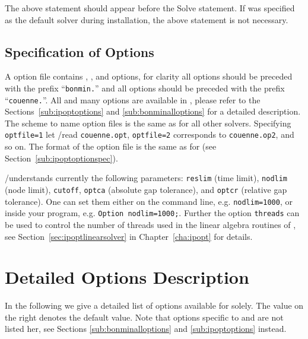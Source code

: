 The above statement should appear before the Solve statement.
If \COUENNE was specified as the default solver during \GAMS installation, the above statement is not necessary.

\subsection{Specification of Options}

A \COUENNE option file contains \IPOPT, \BONMIN, and \COUENNE options, for clarity all \BONMIN options should be preceded with the prefix ``\texttt{bonmin.}'' and all \COUENNE options should be preceded with the prefix ``\texttt{couenne.}''.
All \IPOPT and many \BONMIN options are available in \COUENNE, please refer to the Sections~\ref{sub:ipoptoptions} and \ref{sub:bonminalloptions} for a detailed description.
The scheme to name option files is the same as for all other \GAMS solvers.
Specifying \texttt{optfile=1} let \GAMS/\COUENNE read \texttt{couenne.opt}, \texttt{optfile=2} corresponds to \texttt{couenne.op2}, and so on.
The format of the option file is the same as for \IPOPT (see Section~\ref{sub:ipoptoptionspec}).

\GAMS/\COUENNE understands currently the following \GAMS parameters: \texttt{reslim} (time limit), \texttt{nodlim} (node limit), \texttt{cutoff}, \texttt{optca} (absolute gap tolerance), and \texttt{optcr} (relative gap tolerance).
One can set them either on the command line, e.g. \verb+nodlim=1000+, or inside your \GAMS program, e.g. \verb+Option nodlim=1000;+.
Further the option \texttt{threads} can be used to control the number of threads used in the linear algebra routines of \IPOPT, see Section~\ref{sec:ipoptlinearsolver} in Chapter~\ref{cha:ipopt} for details.

\section{Detailed Options Description}
\label{sub:couenneoptions}

In the following we give a detailed list of options available for \COUENNE solely.
The value on the right denotes the default value.
Note that options specific to \IPOPT and \BONMIN are not listed her, see Sections \ref{sub:bonminalloptions} and \ref{sub:ipoptoptions} instead.




%


\chapterend